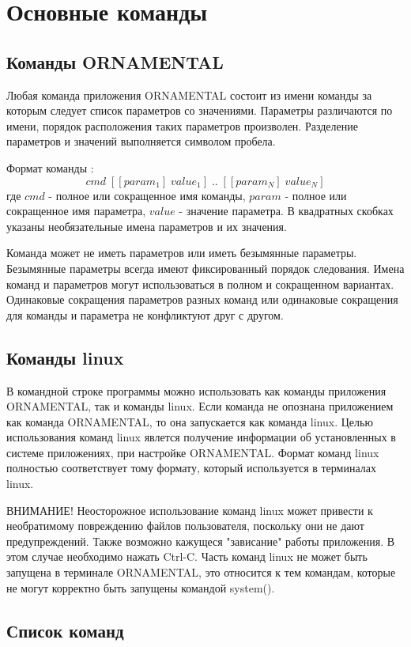 \documentclass[a4paper]{article}
\begin{document}
\section{Основные команды} 
\subsection{Команды ORNAMENTAL}
Любая команда приложения ORNAMENTAL состоит из имени команды за которым следует список параметров со значениями. Параметры различаются по имени, порядок расположения таких параметров произволен. Разделение параметров и значений выполняется символом пробела. 

Формат команды : 
\[
cmd \; [[param_1]\;value_1]\;..\;[[param_N]\;value_N]
\]
где $cmd$ - полное или сокращенное имя команды, $param$ - полное или сокращенное имя параметра, $value$ - значение параметра. В квадратных скобках указаны необязательные имена параметров и их значения.

Команда может не иметь параметров или иметь безымянные параметры. Безымянные параметры всегда имеют фиксированный порядок следования. Имена команд и параметров могут использоваться в полном и сокращенном вариантах. Одинаковые сокращения параметров разных команд или одинаковые сокращения для команды и параметра не конфликтуют друг с другом. 

\subsection{Команды linux}
В командной строке программы можно использовать как команды приложения ORNAMENTAL, так и команды linux. Если команда не опознана приложением как команда ORNAMENTAL, то она запускается как команда linux. Целью использования команд linux явлется получение информации об установленных в системе приложениях, при настройке ORNAMENTAL. Формат команд linux полностью соответствует тому формату, который используется в терминалах linux.

ВНИМАНИЕ! Неосторожное использование команд linux может привести к необратимому повреждению файлов пользователя, поскольку они не дают предупреждений. Также возможно кажущеся "зависание" работы приложения. В этом случае необходимо нажать Ctrl-C. Часть команд linux не может быть запущена в терминале ORNAMENTAL, это относится к тем командам, которые не могут корректно быть запущены командой system().

\subsection{Список команд}
\end{document}
